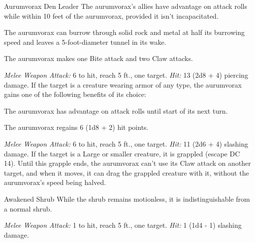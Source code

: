 \documentclass[10pt,a4paper,twoside,bg=print,twocolumn,openany,nodeprecatedcode]{dndbook}
\begin{document}
\begin{DndMonster}[float=t]{Aurumvorax Den Leader}
\DndMonsterBasics[
armor-class = {16 (natural armor)},
hit-points = {\DndDice{8d8 + 16}},
speed = {40 ft., burrow 20 ft.}
]
\DndMonsterAbilityScores[
 str = 18,
 dex = 14,
 con = 14,
 int = 3,
 wis = 13,
 cha = 8
]
\DndMonsterDetails[
saving-throws = {Str +6, Con +4},
skills = {Perception +3, Stealth +4},
condition-immunities = {petrified},
senses = {darkvision 60 ft., passive perception 13},
challenge = 4,
]
The aurumvorax's allies have advantage on attack rolls while within 10 feet of the aurumvorax, provided it isn't incapacitated.

The aurumvorax can burrow through solid rock and metal at half its burrowing speed and leaves a 5-foot-diameter tunnel in its wake.

The aurumvorax makes one Bite attack and two Claw attacks.

\textsl{Melee Weapon Attack:} 6 to hit, reach 5 ft., one target. \textsl{Hit:} 13 (2d8 + 4) piercing damage. If the target is a creature wearing armor of any type, the aurumvorax gains one of the following benefits of its choice:

The aurumvorax has advantage on attack rolls until start of its next turn.

The aurumvorax regains 6 (1d8 + 2) hit points.

\textsl{Melee Weapon Attack:} 6 to hit, reach 5 ft., one target. \textsl{Hit:} 11 (2d6 + 4) slashing damage. If the target is a Large or smaller creature, it is grappled (escape DC 14). Until this grapple ends, the aurumvorax can't use its Claw attack on another target, and when it moves, it can drag the grappled creature with it, without the aurumvorax's speed being halved.

\end{DndMonster}



\begin{DndMonster}[float=t]{Awakened Shrub}
\DndMonsterBasics[
armor-class = {9},
hit-points = {\DndDice{3d6}},
speed = {20 ft.}
]
\DndMonsterAbilityScores[
 str = 3,
 dex = 8,
 con = 11,
 int = 10,
 wis = 10,
 cha = 6
]
\DndMonsterDetails[
damage-vulnerabilities = {fire},
damage-resistances = {piercing},
languages = {one language known by its creator},
challenge = 0,
]
While the shrub remains motionless, it is indistinguishable from a normal shrub.

\textsl{Melee Weapon Attack:} 1 to hit, reach 5 ft., one target. \textsl{Hit:} 1 (1d4 - 1) slashing damage.

\end{DndMonster}
\end{document}
